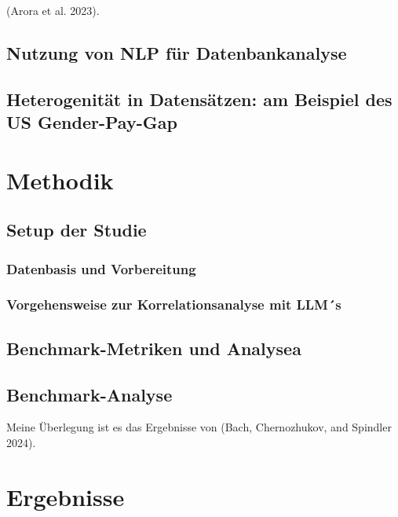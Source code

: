 \documentclass[
  11pt,
]{report}
\begin{document}
(Arora et al. 2023).

\section{Nutzung von NLP für
Datenbankanalyse}\label{nutzung-von-nlp-fuxfcr-datenbankanalyse}

\section{Heterogenität in Datensätzen: am Beispiel des US
Gender-Pay-Gap}\label{heterogenituxe4t-in-datensuxe4tzen-am-beispiel-des-us-gender-pay-gap}

\chapter{Methodik}\label{methodik}

\section{Setup der Studie}\label{setup-der-studie}

\subsection{Datenbasis und
Vorbereitung}\label{datenbasis-und-vorbereitung}

\subsection{Vorgehensweise zur Korrelationsanalyse mit
LLM´s}\label{vorgehensweise-zur-korrelationsanalyse-mit-llms}

\section{Benchmark-Metriken und
Analysea}\label{benchmark-metriken-und-analysea}

\section{Benchmark-Analyse}\label{benchmark-analyse}

Meine Überlegung ist es das Ergebnisse von (Bach, Chernozhukov, and
Spindler 2024).

\chapter{Ergebnisse}\label{ergebnisse}
\end{document}
